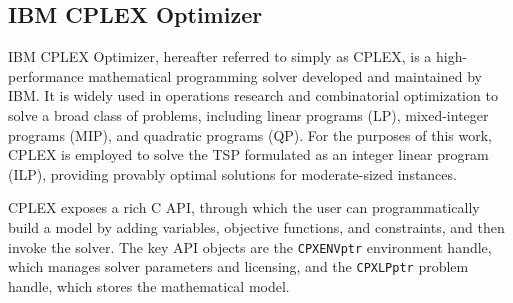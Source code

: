 \documentclass{article}
\begin{document}
\subsection{IBM CPLEX Optimizer}

IBM CPLEX Optimizer, hereafter referred to simply as CPLEX, is a high-performance
mathematical programming solver developed and maintained by IBM. It is widely used in
operations research and combinatorial optimization to solve a broad class of problems,
including linear programs (LP), mixed-integer programs (MIP), and quadratic programs (QP).
For the purposes of this work, CPLEX is employed to solve the TSP formulated as an integer
linear program (ILP), providing provably optimal solutions for moderate-sized instances.


CPLEX exposes a rich C API, through
which the user can programmatically build a model by adding variables, objective functions,
and constraints, and then invoke the solver. The key API objects are the \texttt{CPXENVptr}
environment handle, which manages solver parameters and licensing, and the \texttt{CPXLPptr}
problem handle, which stores the mathematical model.

\end{document}
